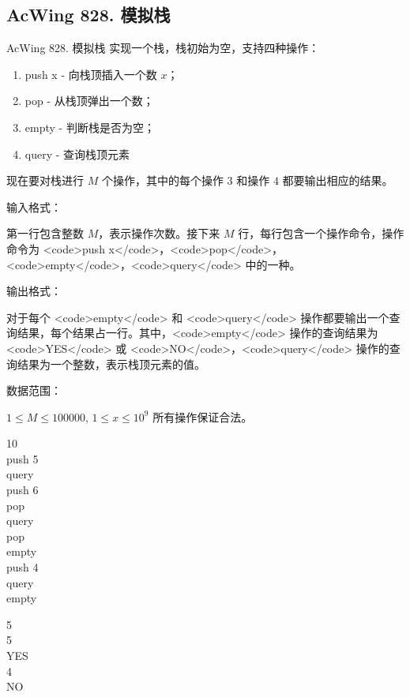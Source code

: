 \subsection{AcWing 828. 模拟栈}
\begin{titledbox}{AcWing 828. 模拟栈}
实现一个栈，栈初始为空，支持四种操作：

\begin{enumerate}
    \itemsep=-5pt
    \item push x - 向栈顶插入一个数 $x$；
    \item pop - 从栈顶弹出一个数；
    \item empty - 判断栈是否为空；
    \item query - 查询栈顶元素
\end{enumerate}

现在要对栈进行 $M$ 个操作，其中的每个操作 $3$ 和操作 $4$ 都要输出相应的结果。

输入格式：

第一行包含整数 $M$，表示操作次数。接下来 $M$ 行，每行包含一个操作命令，操作命令为 <code>push x</code>，<code>pop</code>，<code>empty</code>，<code>query</code> 中的一种。

输出格式：

对于每个 <code>empty</code> 和 <code>query</code> 操作都要输出一个查询结果，每个结果占一行。其中，<code>empty</code> 操作的查询结果为 <code>YES</code> 或 <code>NO</code>，<code>query</code> 操作的查询结果为一个整数，表示栈顶元素的值。

数据范围：

$1 \le M \le 100000$, $1 \le x \le 10^9$ 所有操作保证合法。

\begin{inputblock}
    10 \\
    push 5  \\
    query  \\
    push 6  \\
    pop  \\
    query  \\
    pop  \\
    empty  \\
    push 4  \\
    query  \\
    empty 
\end{inputblock}
\begin{outputblock}
    5 \\
    5 \\
    YES \\
    4 \\
    NO
\end{outputblock}
\end{titledbox}

